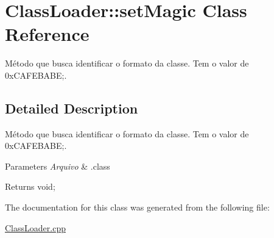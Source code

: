 \hypertarget{class_class_loader_1_1set_magic}{}\section{Class\+Loader\+:\+:set\+Magic Class Reference}
\label{class_class_loader_1_1set_magic}


Método que busca identificar o formato da classe. Tem o valor de 0x\+C\+A\+F\+E\+B\+A\+BE;.  




\subsection{Detailed Description}
Método que busca identificar o formato da classe. Tem o valor de 0x\+C\+A\+F\+E\+B\+A\+BE;. 


\begin{DoxyParams}{Parameters}
{\em Arquivo} & .class \\
\hline
\end{DoxyParams}
\begin{DoxyReturn}{Returns}
void; 
\end{DoxyReturn}


The documentation for this class was generated from the following file\+:\begin{DoxyCompactItemize}
\item 
\hyperlink{_class_loader_8cpp}{Class\+Loader.\+cpp}\end{DoxyCompactItemize}
